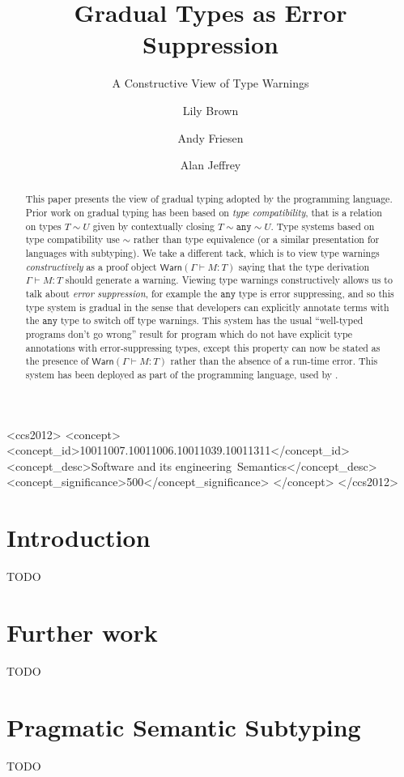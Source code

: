 \documentclass[acmsmall,review,screen]{acmart}
\newcommand{\ANY}{\mathtt{any}}
\newcommand{\WARN}{\mathsf{Warn}}
\newcommand{\compat}{\sim}
\begin{document}
\title{Gradual Types as Error Suppression}
\subtitle{A Constructive View of Type Warnings}

\author{Lily Brown}
\author{Andy Friesen}
\author{Alan Jeffrey}

\begin{abstract}
  This paper presents the view of gradual typing adopted by the
   programming language. Prior work on gradual typing has
  been based on \emph{type compatibility}, that is a relation on types
  $T \compat U$ given by contextually closing $T \compat \ANY \compat
  U$.  Type systems based on type compatibility use $\compat$ rather
  than type equivalence (or a similar presentation for languages with
  subtyping). We take a different tack, which is to view type warnings
  \emph{constructively} as a proof object $\WARN(\Gamma \vdash M : T)$
  saying that the type derivation $\Gamma \vdash M : T$ should
  generate a warning. Viewing type warnings constructively allows us
  to talk about \emph{error suppression}, for example the $\ANY$ type
  is error suppressing, and so this type system is gradual in the
  sense that developers can explicitly annotate terms with the $\ANY$
  type to switch off type warnings. This system has the usual ``well-typed
  programs don't go wrong'' result for program which do not have
  explicit type annotations with error-suppressing types, except this
  property can now be stated as the presence of $\WARN(\Gamma \vdash M
  : T)$ rather than the absence of a run-time error. This system has
  been deployed as part of the  programming language, used
  by .
\end{abstract}

\begin{CCSXML}
<ccs2012>
<concept>
<concept_id>10011007.10011006.10011039.10011311</concept_id>
<concept_desc>Software and its engineering~Semantics</concept_desc>
<concept_significance>500</concept_significance>
</concept>
</ccs2012>
\end{CCSXML}

\maketitle

\section{Introduction}

TODO

\section{Further work}

TODO

\appendix

\section{Pragmatic Semantic Subtyping}

TODO



\end{document}
